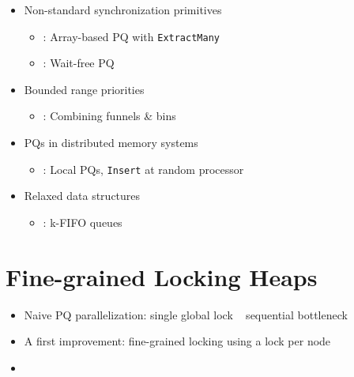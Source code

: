 \documentclass[usenames,dvipsnames]{beamer}
\begin{document}
\begin{frame}{}
\begin{itemize}
\item Non-standard synchronization primitives
    \begin{itemize}
    \item \citeauthor{liu2012lock}: Array-based PQ with \lstinline|ExtractMany|
    \item \citeauthor{israeli1993efficient}: Wait-free PQ
    \end{itemize}

\item Bounded range priorities
    \begin{itemize}
    \item \citeauthor{shavit1999scalable}: Combining funnels \& bins
    \end{itemize}

\item PQs in distributed memory systems
    \begin{itemize}
    \item \citeauthor{sanders1998randomized}: Local PQs, \lstinline|Insert| at random processor
    \end{itemize}

\item Relaxed data structures
    \begin{itemize}
    \item \citeauthor{kirsch2012fast}: k-FIFO queues
    \end{itemize}

\end{itemize}
\end{frame}

\section{Fine-grained Locking Heaps} \label{sec:locking}

\begin{frame}{}
\begin{itemize}
\item Naive PQ parallelization: single global lock \textrightarrow ~ sequential bottleneck
\item A first improvement: fine-grained locking using a lock per node
\item {}
\end{itemize}
\end{frame}
\end{document}

